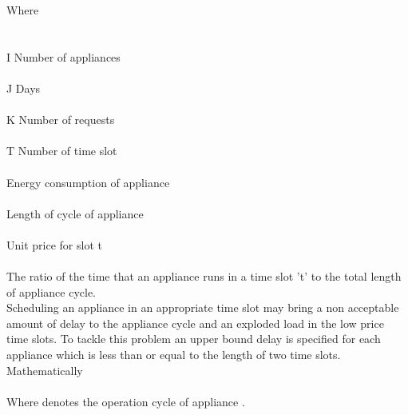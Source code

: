 \documentclass[journal]{IEEEtran}
\begin{document}
Where\\\\\\I    Number of appliances\\\\J    Days\\\\K Number of requests\\\\T    Number of time slot\\\\    Energy consumption of appliance \\\\    Length of cycle of appliance \\\\    Unit price for slot t\\\\    The ratio of the time that an appliance  runs in a time slot 't' to the total length of appliance cycle.\\
\indent Scheduling an appliance in an appropriate time slot may bring a non acceptable amount of delay to the appliance cycle and an exploded load in the low price time slots. To tackle this problem an upper bound delay  is specified for each appliance which is less than or equal to the length of two time slots. Mathematically\\
\\
Where  denotes the operation cycle of appliance .\\
\end{document}
